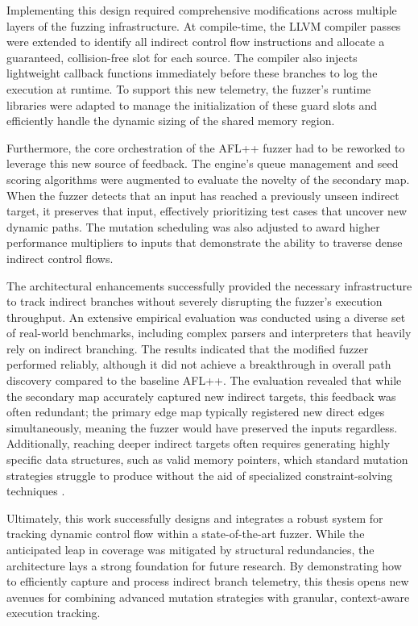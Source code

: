 \documentclass[12pt,english]{report}
\begin{document}
    Implementing this design required comprehensive modifications across multiple layers of the fuzzing infrastructure. At compile-time, the LLVM compiler passes were extended to identify all indirect control flow instructions and allocate a guaranteed, collision-free slot for each source. The compiler also injects lightweight callback functions immediately before these branches to log the execution at runtime. To support this new telemetry, the fuzzer's runtime libraries were adapted to manage the initialization of these guard slots and efficiently handle the dynamic sizing of the shared memory region.

    Furthermore, the core orchestration of the AFL++ fuzzer had to be reworked to leverage this new source of feedback. The engine's queue management and seed scoring algorithms were augmented to evaluate the novelty of the secondary map. When the fuzzer detects that an input has reached a previously unseen indirect target, it preserves that input, effectively prioritizing test cases that uncover new dynamic paths. The mutation scheduling was also adjusted to award higher performance multipliers to inputs that demonstrate the ability to traverse dense indirect control flows.

    The architectural enhancements successfully provided the necessary infrastructure to track indirect branches without severely disrupting the fuzzer's execution throughput. An extensive empirical evaluation was conducted using a diverse set of real-world benchmarks, including complex parsers and interpreters that heavily rely on indirect branching. The results indicated that the modified fuzzer performed reliably, although it did not achieve a breakthrough in overall path discovery compared to the baseline AFL++. The evaluation revealed that while the secondary map accurately captured new indirect targets, this feedback was often redundant; the primary edge map typically registered new direct edges simultaneously, meaning the fuzzer would have preserved the inputs regardless. Additionally, reaching deeper indirect targets often requires generating highly specific data structures, such as valid memory pointers, which standard mutation strategies struggle to produce without the aid of specialized constraint-solving techniques \cite{aschermann2019redqueen, rawat2017vuzzer, wang2010taintscope}.

    Ultimately, this work successfully designs and integrates a robust system for tracking dynamic control flow within a state-of-the-art fuzzer. While the anticipated leap in coverage was mitigated by structural redundancies, the architecture lays a strong foundation for future research. By demonstrating how to efficiently capture and process indirect branch telemetry, this thesis opens new avenues for combining advanced mutation strategies with granular, context-aware execution tracking.

    \printbibliography
    
\end{document}
